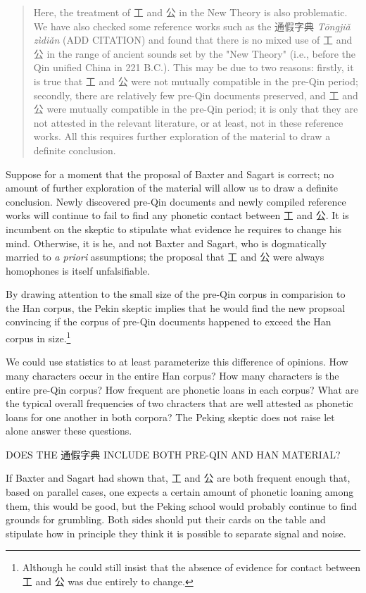 \begin{quote}
Here, the treatment of 工 and 公 in the New Theory is also problematic. We have also checked some reference works such as the 通假字典 \textit{Tōngjiǎ zìdiǎn} (ADD CITATION) and found that there is no mixed use of 工 and 公 in the range of ancient sounds set by the "New Theory" (i.e., before the Qin unified China in 221 B.C.). This may be due to two reasons: firstly, it is true that 工 and 公 were not mutually compatible in the pre-Qin period; secondly, there are relatively few pre-Qin documents preserved, and 工 and 公 were mutually compatible in the pre-Qin period;  
it is only that they are not attested in the relevant literature, or at least, not in these reference works. All this requires further exploration of the material to draw a definite conclusion.
\end{quote}

Suppose for a moment that the proposal of Baxter and Sagart is correct; no amount of further exploration of the material will allow us to draw a definite conclusion. Newly discovered pre-Qin documents and newly compiled reference works will continue to fail to find any phonetic contact between 工 and 公.   
It is incumbent on the skeptic to stipulate what evidence he requires to change his mind. Otherwise, it is he, and not Baxter and Sagart, who is dogmatically married to \textit{a priori} assumptions; the proposal that 工 and 公 were always homophones is itself unfalsifiable. 

By drawing attention to the small size of the pre-Qin corpus in comparision to the Han corpus, 
the Pekin skeptic implies that he would find the new propsoal convincing if the corpus of pre-Qin documents happened to exceed the Han corpus in size.\footnote{Although he could still insist that the absence of evidence for contact between 工 and 公 was due entirely to change.} 

We could use statistics to at least parameterize this difference of opinions. How many characters occur in the entire Han corpus? How many characters is the entire pre-Qin corpus? How frequent are phonetic loans in each corpus? What are the typical overall frequencies of two chracters that are well attested as phonetic loans for one another in both corpora?  
The Peking skeptic does not raise let alone answer these questions.

DOES THE 通假字典 INCLUDE BOTH PRE-QIN AND HAN MATERIAL?

If Baxter and Sagart had shown that, 工 and 公 are both frequent enough that, based on parallel cases, one expects a certain amount of phonetic loaning among them, this would be good, but the Peking school would probably continue to find grounds for grumbling. Both sides should put their cards on the table and stipulate how in principle they think it is possible to separate signal and noise. 

